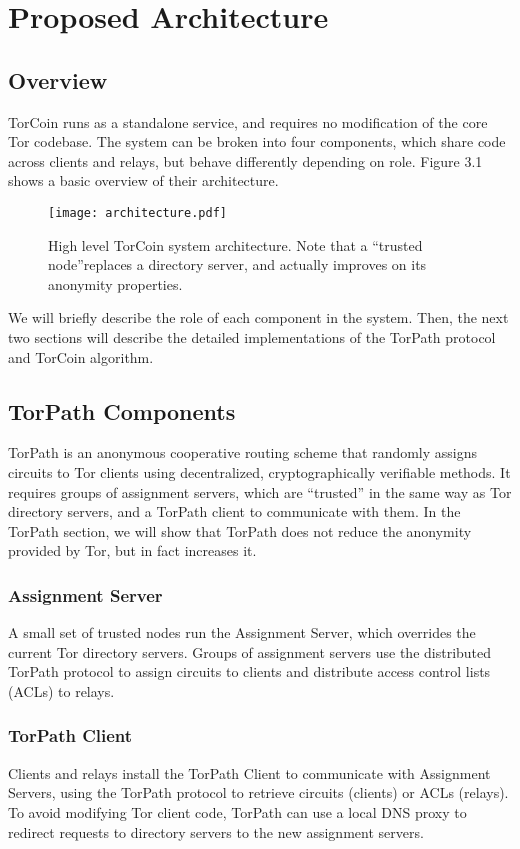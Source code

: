 \section{Proposed Architecture} \label{arch}

\subsection{Overview}

TorCoin runs as a standalone service, and requires no modification of the core
Tor codebase. The system can be broken into four components, which share code
across clients and relays, but behave differently depending on role. Figure 3.1
shows a basic overview of their architecture.

\begin{figure}
  \centering
    \texttt{[image: architecture.pdf]}
  \caption{High level TorCoin system architecture. Note that a ``trusted node''replaces a directory server, and actually improves on its anonymity properties.}
\end{figure}

We will briefly describe the role of each component in the system. Then, the
next two sections will describe the detailed implementations of the TorPath
protocol and TorCoin algorithm.

\subsection{TorPath Components} TorPath is an anonymous cooperative routing
scheme that randomly assigns circuits to Tor clients using decentralized,
cryptographically verifiable methods. It requires groups of assignment servers,
which are ``trusted'' in the same way as Tor directory servers, and a TorPath
client to communicate with them. In the TorPath section, we will show that
TorPath does not reduce the anonymity  provided by Tor, but in fact increases it.

\subsubsection{Assignment Server} A small set of trusted nodes run the
Assignment Server, which overrides the current Tor directory servers. Groups of
assignment servers use the distributed TorPath protocol to assign circuits to
clients and distribute access control lists (ACLs) to relays.

\subsubsection{TorPath Client} Clients and relays install the TorPath Client to
communicate with Assignment Servers, using the TorPath protocol to retrieve
circuits (clients) or ACLs (relays). To avoid modifying Tor client code, TorPath
can use a local DNS proxy to redirect requests to directory servers to the new
assignment servers.

